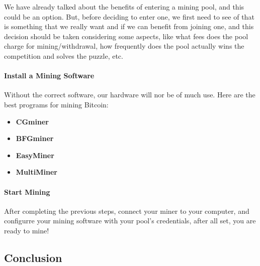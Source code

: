 \documentclass{article}
\newcommand\tab[1][1cm]{\hspace*{#1}}
\begin{document}
\tab We have already talked about the benefits of entering a mining pool, and this could be an option. But, before deciding to enter one, we first need to see of that is something that we really want and if we can benefit from joining one, and this decision should be taken considering some aspects, like what fees does the pool charge for mining/withdrawal, how frequently does the pool actually wins the competition and solves the puzzle, etc.

\paragraph{Install a Mining Software}

\tab Without the correct software, our hardware will nor be of much use. Here are the best programs for mining Bitcoin:

\begin{itemize}
    \item \textbf{CGminer}
    \item \textbf{BFGminer}
    \item \textbf{EasyMiner}
    \item \textbf{MultiMiner}
\end{itemize}
 
\paragraph{Start Mining}
 
\tab After completing the previous steps, connect your miner to your computer, and configurre your mining software with your pool's credentials, after all set, you are ready to mine!

\newpage

\subsection{Conclusion}

\newpage

\nocite{*}
\printbibliography
\end{document}
